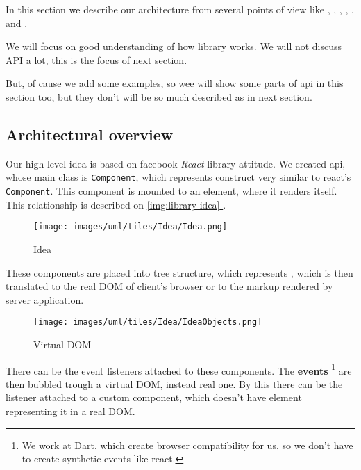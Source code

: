 \documentclass[oneside, 12pt]{book}
\newcommand*{\fullref}[1]{\hyperref[{#1}]{\autoref*{#1} \nameref*{#1}}}
\begin{document}
  In this section we describe our architecture from several points of view like 
	, 
  , 
  , 
  , 
  , 
   and
  .

  We will focus on good understanding of how library works. 
  We will not discuss API a lot, this is the focus of next section. 

  But, of cause we add some examples, so wee will show some parts of api in this section too, 
  but they don't will be so much described as in next section.

  \subsection{Architectural overview}\label{subsec:our-architecture-overview}
	Our high level idea is based on facebook \textit{React} library attitude. 
    We created api, whose main class is \texttt{Component}, which represents construct very similar to react's \texttt{Component}.
    This component is mounted to an element, where it renders itself. 
    This relationship is described on \fullref{img:library-idea}.
    \begin{figure}[h]
    \centering  
      \texttt{[image: images/uml/tiles/Idea/Idea.png]}
      \caption{Idea}
      \label{img:library-idea}
    \end{figure}

    These components are placed into tree structure, which represents \mbox{\textbf{}}, 
    which is then translated to the real DOM of client's browser or to the markup rendered by server application.

    \begin{figure}[h]
    \centering  
      \texttt{[image: images/uml/tiles/Idea/IdeaObjects.png]}
      \caption{Virtual DOM}
      \label{img:library-idea-virtual-dom}
    \end{figure}
    There can be the event listeners attached to these components. 
    The \textbf{events} \footnote{We work at Dart, which create browser compatibility for us, so we don't have to create synthetic events like react.}
    are then bubbled trough a virtual DOM, instead real one.
    By this there can be the listener attached to a custom component, which doesn't have element representing it in a real DOM.
\end{document}

